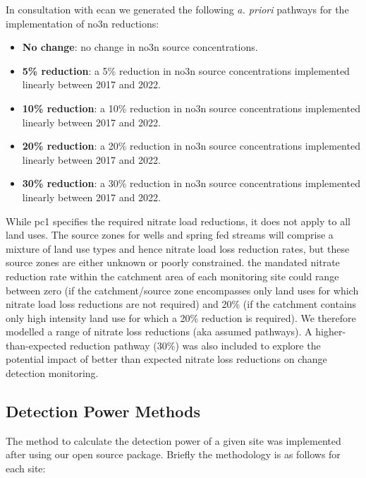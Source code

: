 In consultation with \gls{ecan} we generated the following \textit{a. priori} pathways for the implementation of \gls{no3n} reductions:
\begin{itemize}
    \item \textbf{No change}: no change in \gls{no3n} source concentrations.
    \item \textbf{5\% reduction}: a 5\% reduction in \gls{no3n} source concentrations implemented linearly between 2017 and 2022.
    \item \textbf{10\% reduction}: a 10\% reduction in \gls{no3n} source concentrations implemented linearly between 2017 and 2022.
    \item \textbf{20\% reduction}: a 20\% reduction in \gls{no3n} source concentrations implemented linearly between 2017 and 2022.
    \item \textbf{30\% reduction}: a 30\% reduction in \gls{no3n} source concentrations implemented linearly between 2017 and 2022.
\end{itemize}

While \gls{pc1} specifies the required nitrate load reductions, it does not apply to all land uses.
The source zones for wells and spring fed streams will comprise a mixture of land use types and hence nitrate load loss reduction rates, but these source zones are either unknown or poorly constrained.
the mandated nitrate reduction rate within the catchment area of each monitoring site could range between zero (if the catchment/source zone encompasses only land uses for which nitrate load loss reductions are not required) and 20\% (if the catchment contains only high intensity land use for which a 20\% reduction is required).
We therefore modelled a range of nitrate loss reductions (aka assumed pathways).
A higher-than-expected reduction pathway (30\%) was also included to explore the potential impact of better than expected nitrate loss reductions on change detection monitoring.

\subsection[Detection Power Methods] {Detection Power Methods} \label{subsec:detection_power_methods}

The method to calculate the detection power of a given site was implemented after \citet{dumont_determining_nodate}
using our open source package\citep{dumont_komanawagw_detect_power_2023}.
Briefly the methodology is as follows for each site:

